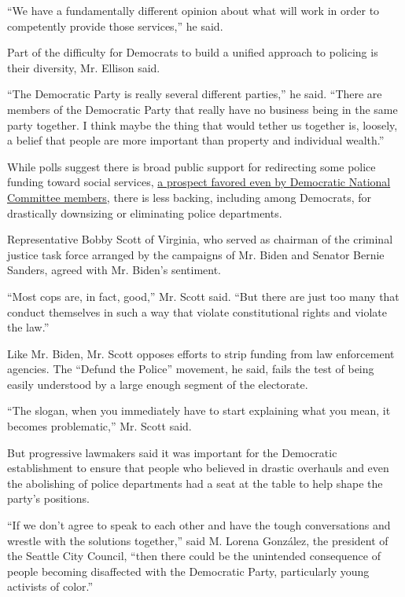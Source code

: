 ``We have a fundamentally different opinion about what will work in
order to competently provide those services,'' he said.

Part of the difficulty for Democrats to build a unified approach to
policing is their diversity, Mr. Ellison said.

``The Democratic Party is really several different parties,'' he said.
``There are members of the Democratic Party that really have no business
being in the same party together. I think maybe the thing that would
tether us together is, loosely, a belief that people are more important
than property and individual wealth.''

While polls suggest there is broad public support for redirecting some
police funding toward social services,
\href{https://www.nytimes3xbfgragh.onion/2020/06/26/us/politics/defund-police-protests-democrats.html}{a
prospect favored even by Democratic National Committee members}, there
is less backing, including among Democrats, for drastically downsizing
or eliminating police departments.

Representative Bobby Scott of Virginia, who served as chairman of the
criminal justice task force arranged by the campaigns of Mr. Biden and
Senator Bernie Sanders, agreed with Mr. Biden's sentiment.

``Most cops are, in fact, good,'' Mr. Scott said. ``But there are just
too many that conduct themselves in such a way that violate
constitutional rights and violate the law.''

Like Mr. Biden, Mr. Scott opposes efforts to strip funding from law
enforcement agencies. The ``Defund the Police'' movement, he said, fails
the test of being easily understood by a large enough segment of the
electorate.

``The slogan, when you immediately have to start explaining what you
mean, it becomes problematic,'' Mr. Scott said.

But progressive lawmakers said it was important for the Democratic
establishment to ensure that people who believed in drastic overhauls
and even the abolishing of police departments had a seat at the table to
help shape the party's positions.

``If we don't agree to speak to each other and have the tough
conversations and wrestle with the solutions together,'' said M. Lorena
González, the president of the Seattle City Council, ``then there could
be the unintended consequence of people becoming disaffected with the
Democratic Party, particularly young activists of color.''

